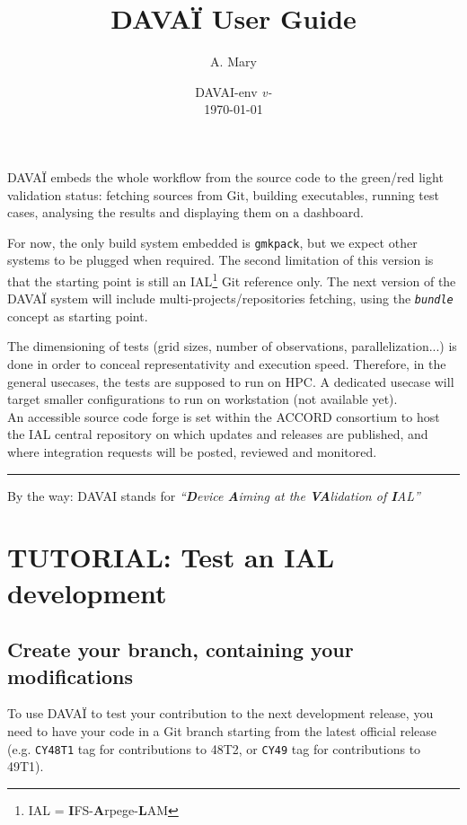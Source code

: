 \documentclass[a4paper,10pt,twoside]{article}
\title{DAVAÏ User Guide}
\author{A. Mary}
\date{DAVAI-env \textit{v-}\\\today}
\begin{document}
\maketitle

\tableofcontents
\vspace{1cm}
\newpage


DAVAÏ embeds the whole workflow from the source code to the green/red light validation status: fetching sources from Git, building executables, running test cases, analysing the results and displaying them on a dashboard.

For now, the only build system embedded is \texttt{gmkpack}, but we expect other systems to be plugged when required. The second limitation of this version is that the starting point is still an IAL\footnote{IAL = \textbf{I}FS-\textbf{A}rpege-\textbf{L}AM} Git reference only. The next version of the DAVAÏ system will include multi-projects/repositories fetching, using the \textit{\texttt{bundle}} concept as starting point.

The dimensioning of tests (grid sizes, number of observations, parallelization...) is done in order to conceal representativity and execution speed. Therefore, in the general usecases, the tests are supposed to run on HPC. A dedicated usecase will target smaller configurations to run on workstation (not available yet).\\

An accessible source code forge is set within the ACCORD consortium to host the IAL central repository on which updates and releases are published, and where integration requests will be posted, reviewed and monitored.
\begin{center}
 \rule{8cm}{1pt}
\end{center}

By the way: DAVAI stands for \textit{``\textbf{D}evice \textbf{A}iming at the \textbf{VA}lidation of \textbf{I}AL''}

\newpage
\section{TUTORIAL: Test an IAL development} 
\subsection{Create your branch, containing your modifications}
To use DAVAÏ to test your contribution to the next development release, you need to have your code in a Git branch starting from the latest official release (e.g. \texttt{CY48T1} tag for contributions to 48T2, or \texttt{CY49} tag for contributions to 49T1).
\end{document}
